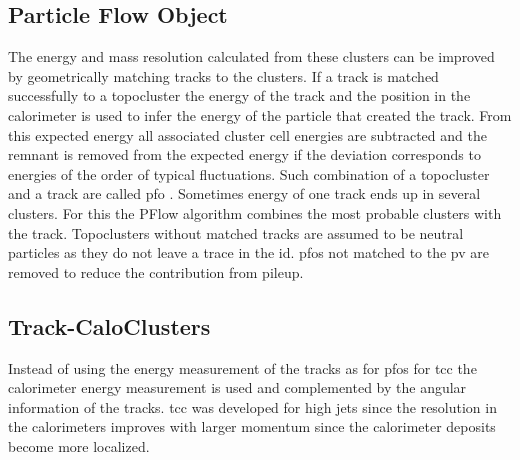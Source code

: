 \subsection{Particle Flow Object}
The energy and mass resolution calculated from these clusters can be improved by geometrically matching tracks to the clusters. If a track is matched successfully to a topocluster the energy of the track and the position in the calorimeter is used to infer the energy of the particle that created the track. From this expected energy all associated cluster cell energies are subtracted and the remnant is removed from the expected energy if the deviation corresponds to energies of the order of typical fluctuations. Such combination of a topocluster and a track are called \ac{pfo} \citep{aaboud2017jet}. Sometimes energy of one track ends up in several clusters. For this the PFlow algorithm combines the most probable clusters with the track. Topoclusters without matched tracks are assumed to be neutral particles as they do not leave a trace in the \ac{id}. \ac{pfo}s not matched to the \ac{pv} are removed to reduce the contribution from pileup.

\subsection{Track-CaloClusters}
Instead of using the energy measurement of the tracks as for \acp{pfo} for \ac{tcc} the calorimeter energy measurement is used and complemented by the angular information of the tracks. \ac{tcc} was developed for high \pt jets since the resolution in the calorimeters improves with larger momentum since the calorimeter deposits become more localized.


